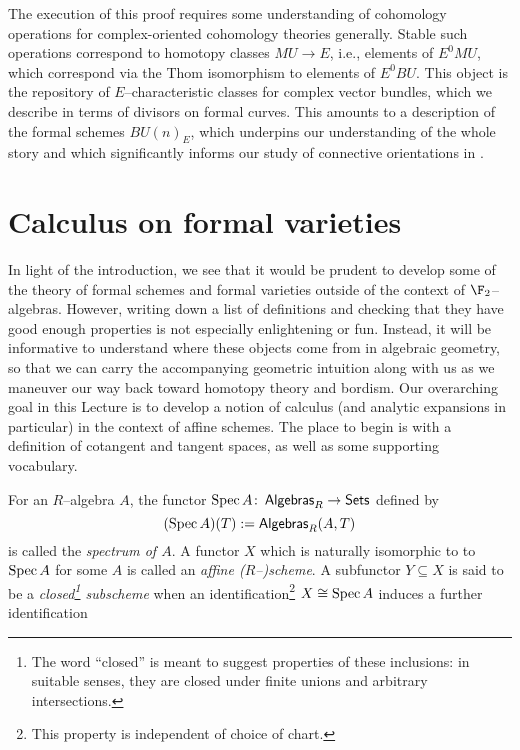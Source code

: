 The execution of this proof requires some understanding of cohomology operations for complex-oriented cohomology theories generally.  Stable such operations correspond to homotopy classes $MU \to E$, i.e., elements of $E^0 MU$, which correspond via the Thom isomorphism to elements of $E^0 BU$.  This object is the repository of $E$--characteristic classes for complex vector bundles, which we describe in terms of divisors on formal curves.  This amounts to a description of the formal schemes $BU(n)_E$, which underpins our understanding of the whole story and which significantly informs our study of connective orientations in .









\section{Calculus on formal varieties}\label{FormalVarietiesLecture}

In light of the introduction, we see that it would be prudent to develop some of the theory of formal schemes and formal varieties outside of the context of $\F_2$--algebras.  However, writing down a list of definitions and checking that they have good enough properties is not especially enlightening or fun.  Instead, it will be informative to understand where these objects come from in algebraic geometry, so that we can carry the accompanying geometric intuition along with us as we maneuver our way back toward homotopy theory and bordism.  Our overarching goal in this Lecture is to develop a notion of calculus (and analytic expansions in particular) in the context of affine schemes.  The place to begin is with a definition of cotangent and tangent spaces, as well as some supporting vocabulary.
\begin{definition}
For an $R$--algebra $A$, the functor $\operatorname{Spec} A \colon\thinspace \mathsf{Algebras}_R \to \mathsf{Sets}$ defined by \[(\operatorname{Spec} A)(T) := \mathsf{Algebras}_R(A, T)\] is called the \textit{spectrum of $A$}.  A functor $X$ which is naturally isomorphic to to $\operatorname{Spec} A$ for some $A$ is called an \textit{affine ($R$--)scheme}.  A subfunctor $Y \subseteq X$ is said to be a \textit{closed\footnote{The word ``closed'' is meant to suggest properties of these inclusions: in suitable senses, they are closed under finite unions and arbitrary intersections.} subscheme} when an identification\footnote{This property is independent of choice of chart.} $X \cong \operatorname{Spec} A$ induces a further identification
\begin{center}
\end{center}
\end{definition}

